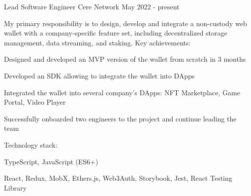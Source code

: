 

\begin{cventries}


  \cventry
    {Lead Software Engineer} %
    {Cere Network} %
    {} %
    {May 2022 - present} %
    {
      My primary responsibility is to design, develop and integrate a non-custody web wallet with a company-specific feature set, including decentralized storage management, data streaming, and staking.
      \newline
      \vspace{2mm}
      Key achievements:
      \vspace{4mm}
      \begin{cvitems}
        \item Designed and developed an MVP version of the wallet from scratch in 3 months
        \item Developed an SDK allowing to integrate the wallet into DApps
        \item Integrated the wallet into several company's DApps: NFT Marketplace, Game Portal, Video Player
        \item Successfully onboarded two engineers to the project and continue leading the team
      \end{cvitems}
      \vspace{5mm}
      Technology stack:
      \begin{cvstackitems}
        \item TypeScript, JavaScript (ES6+)
        \item React, Redux, MobX, Ethers.js, Web3Auth, Storybook, Jest, React Testing Library
      \end{cvstackitems}
    }


\end{cventries}
